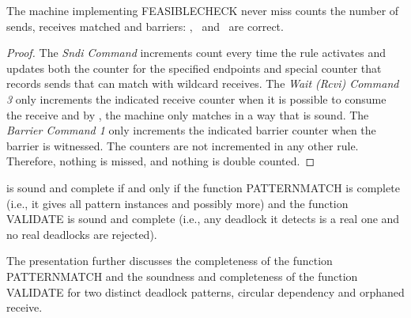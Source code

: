 \begin{cor}
  The machine implementing \textrm{FEASIBLECHECK} never miss counts the number of sends, receives matched and barriers: \eprcv, \epsnd\ and \epbarrier\ are correct.
\end{cor}
\label{cor:count}
\begin{proof}
  The \emph{Sndi Command} increments count every time the rule activates and updates both the counter for the specified endpoints and special counter that records sends that can match with wildcard receives. The \emph{Wait (Rcvi) Command 3} only increments the indicated receive counter when it is possible to consume the receive and by , the machine only matches in a way that is sound. The \emph{Barrier Command 1} only increments the indicated barrier counter when the barrier is witnessed. The counters are not incremented in any other rule. Therefore, nothing is missed, and nothing is double counted.
\end{proof}
\begin{cor}
   is sound and complete if and only if the function \textrm{PATTERNMATCH} is complete (i.e., it gives all pattern instances and possibly more) and the function \textrm{VALIDATE} is sound and complete (i.e., any deadlock it detects is a real one and no real deadlocks are rejected).
\end{cor}
  
The presentation further discusses the completeness of the function \textrm{PATTERNMATCH} and the soundness and completeness of the function \textrm{VALIDATE} for two distinct deadlock patterns, circular dependency and orphaned receive. 

